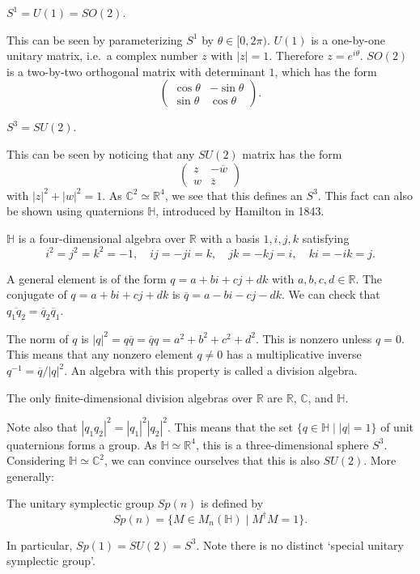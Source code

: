 \documentclass[12pt]{article}
\numberwithin{equation}{section}
\def\bC{\mathbb{C}}
\def\bH{\mathbb{H}}
\def\bR{\mathbb{R}}
\let\bar\overline
\begin{document}
\begin{proposition}
$S^1=U(1)=SO(2)$.
\end{proposition}
This can be seen by parameterizing $S^1$ by $\theta \in [0,2\pi)$.
$U(1)$ is a one-by-one unitary matrix, i.e.~a complex number $z$ with $|z|=1$.
Therefore $z=e^{i\theta}$.
$SO(2)$ is a two-by-two orthogonal matrix with determinant $1$, which has the form \begin{equation}
  \begin{pmatrix}
    \cos\theta & -\sin\theta \\
    \sin\theta & \cos\theta
  \end{pmatrix}.
\end{equation}

\begin{proposition}
$S^3=SU(2)$.
\end{proposition}
This can be seen by noticing that any $SU(2)$ matrix has the form \begin{equation}
  \begin{pmatrix}
    z & -\overline w\\
    w & \overline z
  \end{pmatrix}
\end{equation} with $|z|^2+|w|^2=1$.
As $\bC^2\simeq \bR^4$, we see that this defines an $S^3$.
This fact can also be shown using quaternions $\bH$, 
introduced by Hamilton in 1843.
\begin{definition}
$\bH$ is a four-dimensional algebra over $\bR$ with a basis $1,i,j,k$ satisfying \begin{equation}
  i^2=j^2=k^2=-1, \quad
  ij=-ji=k, \quad
  jk=-kj=i, \quad
  ki=-ik=j.\label{eq:rel-of-H}
\end{equation}
\end{definition}

A general element is of the form $q=a+bi+cj+dk$ with $a,b,c,d\in \bR$.
The conjugate of $q=a+bi+cj+dk$ is $\bar q=a-bi-cj-dk$.
We can check that $\overline{q_1 q_2}=\bar q_2 \bar q_1$.

The norm of $q$ is $|q|^2=q\bar q=\bar q q=a^2+b^2+c^2+d^2$.
This is nonzero unless $q=0$.
This means that any nonzero element $q\neq 0$ has a multiplicative inverse $q^{-1}=\bar q/|q|^2$.
An algebra with this property is called a division algebra.
\begin{fact}
  The only finite-dimensional division algebras over $\bR$ are $\bR$, $\bC$, and $\bH$.
\end{fact}

Note also that $|q_1 q_2|^2=|q_1|^2 |q_2|^2$.
This means that the set $\{ q\in \bH \mid |q|=1 \}$ of unit quaternions forms a group.
As $\bH\simeq \bR^4$, this is a three-dimensional sphere $S^3$.
Considering $\bH\simeq \bC^2$, we can convince ourselves that this is also $SU(2)$.
More generally:
\begin{example}
  The unitary symplectic group $Sp(n)$ is defined by \begin{equation}
    Sp(n) = \{ M\in M_{n}(\bH) \mid M^\dagger M = 1 \}.
  \end{equation}
\end{example}
In particular, $Sp(1)=SU(2)=S^3$.
Note there is no distinct `special unitary symplectic group'.
\end{document}
